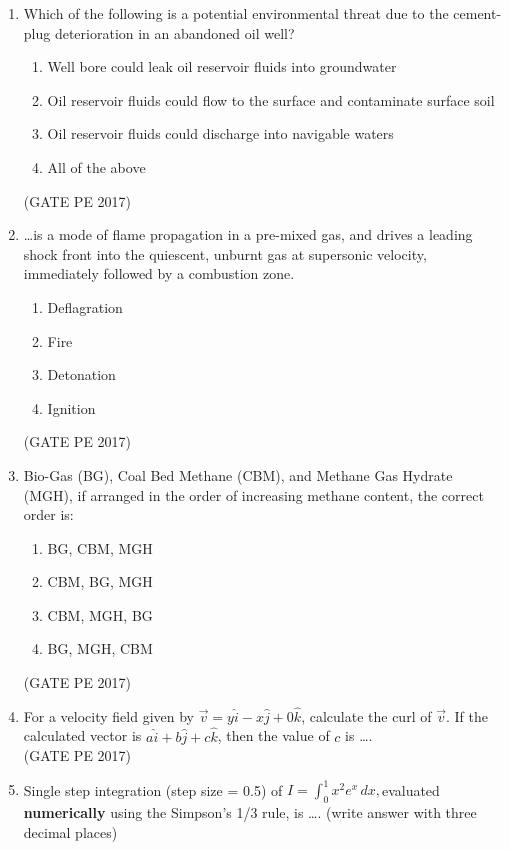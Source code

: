 \documentclass[journal,12pt,onecolumn]{IEEEtran}
\theoremstyle{remark}
\begin{document}
\begin{enumerate}
\item Which of the following is a potential environmental threat due to the cement-plug deterioration in an abandoned oil well?
\begin{enumerate}
\item Well bore could leak oil reservoir fluids into groundwater
\item Oil reservoir fluids could flow to the surface and contaminate surface soil
\item Oil reservoir fluids could discharge into navigable waters
\item All of the above
\end{enumerate}
\hfill{(GATE PE 2017)}

\item \dots is a mode of flame propagation in a pre-mixed gas, and drives a leading shock front into the quiescent, unburnt gas at supersonic velocity, immediately followed by a combustion zone.
\begin{enumerate}
\item Deflagration
\item Fire
\item Detonation
\item Ignition
\end{enumerate}
\hfill{(GATE PE 2017)}

\item Bio-Gas (BG), Coal Bed Methane (CBM), and Methane Gas Hydrate (MGH), if arranged in the order of increasing methane content, the correct order is:
\begin{enumerate}
\item BG, CBM, MGH
\item CBM, BG, MGH
\item CBM, MGH, BG
\item BG, MGH, CBM
\end{enumerate}
\hfill{(GATE PE 2017)}

\item For a velocity field given by $\vec{v} = y \hat{i} - x \hat{j} + 0 \hat{k}$, calculate the curl of $\vec{v}$. If the calculated vector is $a \hat{i} + b \hat{j} + c \hat{k}$, then the value of $c$ is \dots.\\

\hfill{(GATE PE 2017)}

\item Single step integration (step size = 0.5) of $ I = \int_0^1 x^2 e^x \, dx,$evaluated \textbf{numerically} using the Simpson's 1/3 rule, is \dots. (write answer with three decimal places)\\


\end{enumerate}
\end{document}
